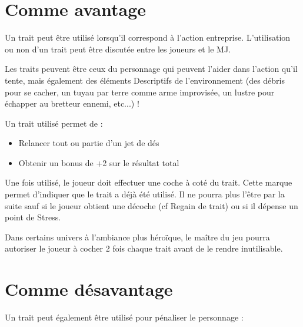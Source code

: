 \documentclass{conf/FusinaClass}
\begin{document}
\section{Comme avantage}
Un trait peut être utilisé lorsqu'il correspond à l'action entreprise. L'utilisation ou non d'un trait peut être discutée entre les joueurs et le MJ.

Les traits peuvent être ceux du personnage qui peuvent l'aider dans l'action qu'il tente, mais également des éléments Descriptifs de l'environnement (des débris pour se cacher, un tuyau par terre comme arme improvisée, un lustre pour échapper au bretteur ennemi, etc...) !


Un trait utilisé permet de :

\begin{itemize}
\item Relancer tout ou partie d'un jet de dés
\item Obtenir un bonus de +2 sur le résultat total
\end{itemize}

Une fois utilisé, le joueur doit effectuer une coche à coté du trait. Cette marque permet d'indiquer que le trait a déjà été utilisé. Il ne pourra plus l'être par la suite sauf si le joueur obtient une décoche (cf Regain de trait) ou si il dépense un point de Stress.

Dans certains univers à l'ambiance plus héroïque, le maître du jeu pourra autoriser le joueur à cocher 2 fois chaque trait avant de le rendre inutilisable.

\section{Comme désavantage}
Un trait peut également être utilisé pour pénaliser le personnage : 
\end{document}
